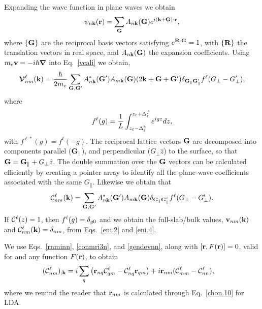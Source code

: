 \documentclass[floatfix,prb,aps,superscriptaddress,11pt,preprint,letterpaper]{revtex4}
\def\chon{red}
\begin{document}
Expanding the wave function in plane waves we obtain
\begin{align}\label{eni.1}
\psi_{n\mathbf{k}}(\mathbf{r})=\sum_{\mathbf{G}} A_{n\mathbf{k}}(\mathbf{G})e^{i(\mathbf{k}+\mathbf{G})\cdot\mathbf{r}}
,
\end{align}
where $\{\mathbf{G}\}$ are the reciprocal basis vectors satisfying
$e^{\mathbf{R}\cdot\mathbf{G}}=1$, with $\{\mathbf{R}\}$ the translation vectors in real
space, and $A_{n\mathbf{k}}(\mathbf{G})$ {\color{\chon} the} expansion coefficients. Using
$m_e\mathbf{v}=-i\hbar\boldsymbol{\nabla}$ into 
Eq.~\eqref{vcali}
we obtain,\cite{mendozaPRB06}
\begin{align}\label{eni.2}
\boldsymbol{\mathcal{\cal V}}^\ell_{nm}(\mathbf{k})=
\frac{\hbar}{2m_e}
\sum_{\mathbf{G},\mathbf{G}'} A^*_{n\mathbf{k}}(\mathbf{G}')  A_{m\mathbf{k}}(\mathbf{G})
(2\mathbf{k}+\mathbf{G}+\mathbf{G}')
\delta_{\mathbf{G}_\parallel \mathbf{G}'_\parallel}  
f^\ell(G_\perp-G'_\perp)
,
\end{align}   
where
\begin{align}\label{vnl.9}
f^\ell(g)=\frac{1}{L}\int_{z_\ell-\Delta^b_\ell}^{z_\ell+\Delta^f_\ell} e^{igz}dz  
 ,
\end{align}
with $f^{\ell*}(g)=f^\ell(-g)$. 
{\color{\chon} The} reciprocal lattice vectors $\mathbf{G}$ are 
decomposed into components
{\color{\chon} parallel ($\mathbf{G}_\parallel$), and perpendicular ($G_\perp \hat z$)} 
to the surface, so
that $\mathbf{G} = \mathbf{G}_\parallel + G_\perp\hat z$.
The double summation over the $\mathbf{G}$ vectors can be 
{\color{\chon} calculated efficiently} by  
creating a pointer array to identify all the plane-wave coefficients  
associated with the same $G_\parallel$.  
Likewise we obtain that
\begin{align}\label{eni.4}
{\mathbf{\cal C}}^\ell_{nm}(\mathbf{k})=
\sum_{\mathbf{G},\mathbf{G}'} A^*_{n\mathbf{k}}(\mathbf{G}')  A_{m\mathbf{k}}(\mathbf{G})
\delta_{\mathbf{G}_\parallel \mathbf{G}'_\parallel} 
f^\ell(G_\perp-G'_\perp)
.
\end{align}  
If ${\mathbf{\cal C}}^\ell(z)=1$, {\color{\chon} then $f^\ell(g)=\delta_{g0}$ and we 
obtain the full-slab/bulk values, 
$\mathbf{v}_{nm}(\mathbf{k})$ and ${\mathbf{\cal C}}^\ell_{nm}(\mathbf{k})=\delta_{nm}$,
from Eqs.~\eqref{eni.2} and \eqref{eni.4}}.

We use Eqs.~\eqref{rnminn}, \eqref{conmri3n}, and \eqref{gendevnn},
along with $[\mathbf{r},F(\mathbf{r})]=0$, valid for 
and any function $F(\mathbf{r})$, 
{\color{\chon} to }obtain
\begin{align} 
({\mathbf{\cal C}}^\ell_{nm})_{;\mathbf{k}}
&=
i
\sum_{q} 
 \left(\mathbf{r}_{nq}
{\mathbf{\cal C}}^\ell_{qm}
-
{\mathbf{\cal C}}^\ell_{nq}
\mathbf{r}_{qm}
\right) 
+i\mathbf{r}_{nm}({\mathbf{\cal C}}^\ell_{mm}-{\mathbf{\cal C}}^\ell_{nn}) 
,
\end{align} 
where we remind the reader that $\mathbf{r}_{nm}$ 
{\color{\chon} is} calculated through
Eq.~\eqref{chon.10} for LDA. 
\end{document}
